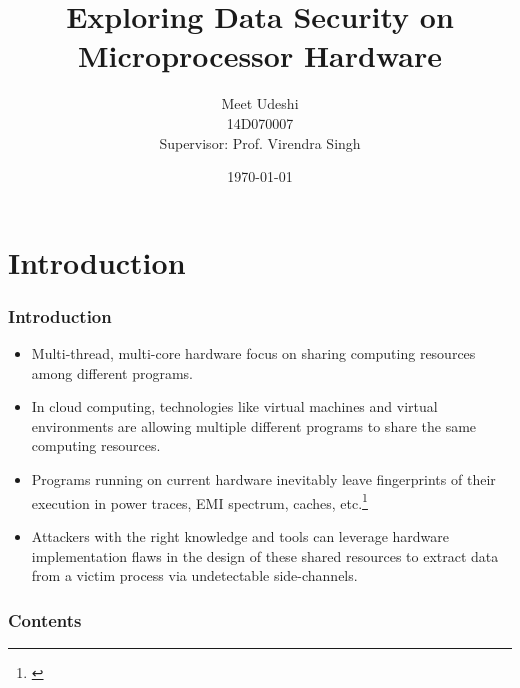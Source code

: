 \documentclass[10pt,usenames,dvipsnames]{beamer}
\title[DDP Presentation]{Exploring Data Security on Microprocessor Hardware} %
\author{Meet Udeshi\\
14D070007\\
Supervisor: Prof. Virendra Singh} %
\institute[CADSL] %
{
CADSL - IIT Bombay %
}
\date{\today} %
\begin{document}

\begin{frame}
\titlepage %
\end{frame}


\section{Introduction}


\begin{frame}
\frametitle{Introduction}
\begin{itemize}
    \item Multi-thread, multi-core hardware focus on sharing computing resources
        among different programs.
    \item In cloud computing, technologies like virtual machines and virtual environments
        are allowing multiple different programs to share the same computing resources.
    \item Programs running on current hardware inevitably leave fingerprints of
        their execution in power traces, EMI spectrum,
        caches, etc.\footnote{\cite{side_channel_intro}}
    \item Attackers with the right knowledge and tools can leverage hardware
        implementation flaws in the design of these shared resources
        to extract data from a victim process via undetectable side-channels.
\end{itemize}
\end{frame}

\begin{frame}
\frametitle{Contents} %
\tableofcontents %
\end{frame}
\end{document}
